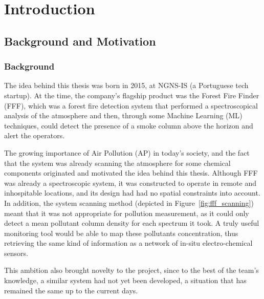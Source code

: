 \newcommand{\novathesis}{\emph{novathesis}}
\newcommand{\novathesisclass}{\texttt{novathesis.cls}}


\chapter{Introduction}
\label{cha:introduction}

\section{Background and Motivation}%
\label{sec:bg_and_motivation}

\subsection{Background}%
\label{sub:background}

The idea behind this thesis was born in 2015, at NGNS-IS (a Portuguese
tech startup). At the time, the company's flagship product was the
Forest Fire Finder (\gls{FFF}), which was a forest fire detection system
that performed a spectroscopical analysis of the atmosphere and then,
through some Machine Learning (\gls{ML}) techniques, could detect the
presence of a smoke column above the horizon and alert the operators.

The growing importance of Air Pollution (\gls{AP}) in today's society,
and the fact that the system was already scanning the atmosphere for
some chemical components originated and motivated the idea behind this
thesis. Although \gls{FFF} was already a spectroscopic system, it was
constructed to operate in remote and inhospitable locations, and its
design had had no spatial constraints into account. In addition, the
system scanning method (depicted in Figure~\ref{fig:fff_scanning}) meant
that it was not appropriate for pollution measurement, as it could only
detect a mean pollutant column density for each spectrum it took. A
truly useful monitoring tool would be able to map these pollutants
concentration, thus retrieving the same kind of information as a network
of in-situ electro-chemical sensors.

This ambition also brought novelty to the project, since to the best of
the team's knowledge, a similar system had not yet been developed, a
situation that has remained the same up to the current days.

